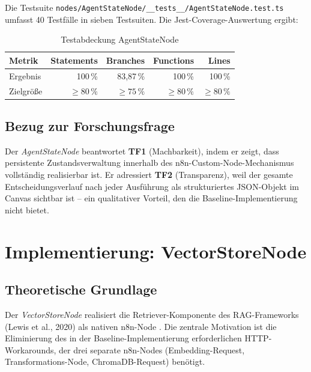 \documentclass[12pt,a4paper,oneside]{report}
\begin{document}
Die Testsuite \texttt{nodes/AgentStateNode/\_\_tests\_\_/AgentStateNode.test.ts}
umfasst 40 Testfälle in sieben Testsuiten. Die Jest-Coverage-Auswertung ergibt:

\begin{table}[H]
  \centering
  \caption{Testabdeckung AgentStateNode}
  \label{tab:coverage-agentstate}
  \begin{tabular}{lrrrr}
    \toprule
    \textbf{Metrik} & \textbf{Statements} & \textbf{Branches} & \textbf{Functions} & \textbf{Lines} \\
    \midrule
    Ergebnis & 100\,\% & 83,87\,\% & 100\,\% & 100\,\% \\
    Zielgröße & $\geq 80\,\%$ & $\geq 75\,\%$ & $\geq 80\,\%$ & $\geq 80\,\%$ \\
    \bottomrule
  \end{tabular}
\end{table}

\section{Bezug zur Forschungsfrage}

Der \textit{AgentStateNode} beantwortet \textbf{TF1} (Machbarkeit), indem er zeigt,
dass persistente Zustandsverwaltung innerhalb des n8n-Custom-Node-Mechanismus vollständig
realisierbar ist. Er adressiert \textbf{TF2} (Transparenz), weil der gesamte
Entscheidungsverlauf nach jeder Ausführung als strukturiertes JSON-Objekt im Canvas
sichtbar ist -- ein qualitativer Vorteil, den die Baseline-Implementierung nicht bietet.

\chapter{Implementierung: VectorStoreNode}

\section{Theoretische Grundlage}

Der \textit{VectorStoreNode} realisiert die Retriever-Komponente des \ac{RAG}-Frameworks
(Lewis et al., 2020) als nativen n8n-Node \cite{lewis2020retrieval}. Die zentrale
Motivation ist die Eliminierung des in der Baseline-Implementierung erforderlichen
HTTP-Workarounds, der drei separate n8n-Nodes (Embedding-Request, Transformations-Node,
ChromaDB-Request) benötigt.
\end{document}
